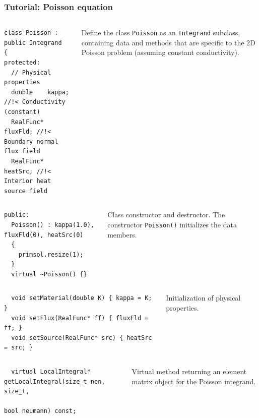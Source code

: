 \documentclass{beamer}
\begin{document}
\begin{frame}[fragile] %
 \frametitle{Tutorial: Poisson equation}

 \begin{columns}[c]
  \tiny\begin{verbatim}
class Poisson : public Integrand
{
protected:
  // Physical properties
  double    kappa;   //!< Conductivity (constant)
  RealFunc* fluxFld; //!< Boundary normal flux field
  RealFunc* heatSrc; //!< Interior heat source field
  \end{verbatim}
   \small
  Define the class {\tt Poisson} as an {\tt Integrand} subclass,
  containing data and methods that are specific to the 2D Poisson problem
  (assuming constant conductivity).
 \end{columns}
 \pause
 \begin{columns}[c]
  \tiny\begin{verbatim}
public:
  Poisson() : kappa(1.0), fluxFld(0), heatSrc(0)
  {
    primsol.resize(1);
  }
  virtual ~Poisson() {}
  \end{verbatim}
  \small
  Class constructor and destructor.
  The constructor {\tt Poisson()} initializes the data members.
 \end{columns}
 \pause
 \begin{columns}[c]
  \tiny\begin{verbatim}
  void setMaterial(double K) { kappa = K; }
  void setFlux(RealFunc* ff) { fluxFld = ff; }
  void setSource(RealFunc* src) { heatSrc = src; }
  \end{verbatim}
   \small
  Initialization of physical properties.
 \end{columns}
 \pause
 \begin{columns}[c]
  \tiny\begin{verbatim}
  virtual LocalIntegral* getLocalIntegral(size_t nen, size_t,
                                          bool neumann) const;
  \end{verbatim}
   \small
  Virtual method returning an element matrix object for the Poisson integrand.
 \end{columns}

\end{frame}
\end{document}
